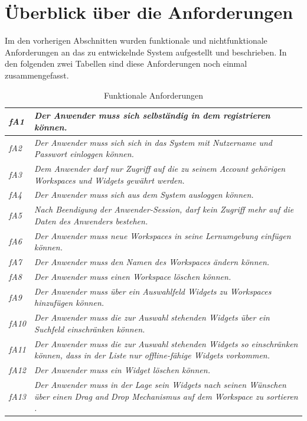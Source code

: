 \section{Überblick über die Anforderungen}
Im den vorherigen Abschnitten wurden funktionale und nichtfunktionale Anforderungen an das zu entwickelnde System aufgestellt und beschrieben. In den folgenden zwei Tabellen sind diese Anforderungen noch einmal zusammengefasst.

\renewcommand{\arraystretch}{1.4} 
\begin{table}[ht]
\caption{Funktionale Anforderungen}
\begin{tabularx}{\textwidth}{ l | X }
\emph{fA1} & \emph{Der Anwender muss sich selbständig in dem registrieren können.} \\ \hline
\emph{fA2} & \emph{Der Anwender muss sich sich in das System mit Nutzername und Passwort einloggen können.} \\ \hline
\emph{fA3} & \emph{Dem Anwender darf nur Zugriff auf die zu seinem Account gehörigen Workspaces und Widgets gewährt werden.} \\ \hline
\emph{fA4} & \emph{Der Anwender muss sich aus dem System ausloggen können.} \\ \hline
\emph{fA5} & \emph{Nach Beendigung der Anwender-Session, darf kein Zugriff mehr auf die Daten des Anwenders bestehen.} \\ \hline
\emph{fA6} & \emph{Der Anwender muss neue Workspaces in seine Lernumgebung einfügen können.} \\ \hline
\emph{fA7} & \emph{Der Anwender muss den Namen des Workspaces ändern können.} \\ \hline
\emph{fA8} & \emph{Der Anwender muss einen Workspace löschen können.} \\ \hline
\emph{fA9} & \emph{Der Anwender muss über ein Auswahlfeld Widgets zu Workspaces hinzufügen können.} \\ \hline
\emph{fA10} & \emph{Der Anwender muss die zur Auswahl stehenden Widgets über ein Suchfeld einschränken können.} \\ \hline
\emph{fA11} & \emph{Der Anwender muss die zur Auswahl stehenden Widgets so einschränken können, dass in der Liste nur offline-fähige Widgets vorkommen.} \\ \hline
\emph{fA12} & \emph{Der Anwender muss ein Widget löschen können.} \\\hline
\emph{fA13} & \emph{Der Anwender muss in der Lage sein Widgets nach seinen Wünschen über einen Drag and Drop Mechanismus auf dem Workspace zu sortieren .} \\ \hline
\end{tabularx}
\label{table:funktionale_anforderungen}
\end{table}

